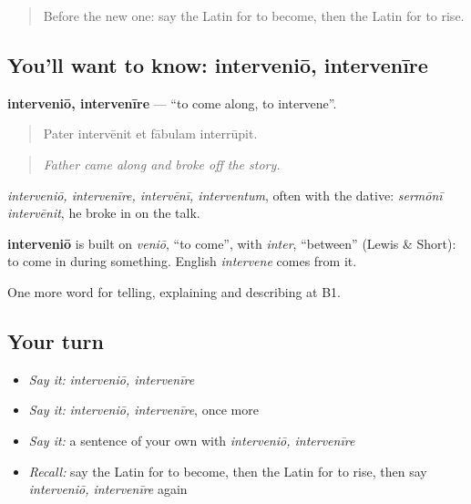 \begin{quote}
Before the new one: say the Latin for to become, then the Latin for to rise.
\end{quote}

\subsection*{You'll want to know: interveniō, intervenīre}
\textbf{interveniō, intervenīre} — \textquotedblleft{}to come along, to intervene\textquotedblright{}.

\begin{quote}
Pater intervēnit et fābulam interrūpit.
\end{quote}

\begin{quote}
\emph{Father came along and broke off the story.}
\end{quote}

\emph{interveniō, intervenīre, intervēnī, interventum}, often with the dative: \emph{sermōnī intervēnit}, he broke in on the talk.

\begin{cousinweb}
\textbf{interveniō} is built on \emph{veniō}, \textquotedblleft{}to come\textquotedblright{}, with \emph{inter}, \textquotedblleft{}between\textquotedblright{} (Lewis \& Short): to come in during something. English \emph{intervene} comes from it.
\end{cousinweb}

\begin{grammarlens}[title={What you've built}]
One more word for telling, explaining and describing at B1.
\end{grammarlens}

\subsection*{Your turn}
\begin{itemize}
\raggedright
  \item \emph{Say it:} \emph{interveniō, intervenīre}
  \item \emph{Say it:} \emph{interveniō, intervenīre}, once more
  \item \emph{Say it:} a sentence of your own with \emph{interveniō, intervenīre}
  \item \emph{Recall:} say the Latin for to become, then the Latin for to rise, then say \emph{interveniō, intervenīre} again
\end{itemize}

